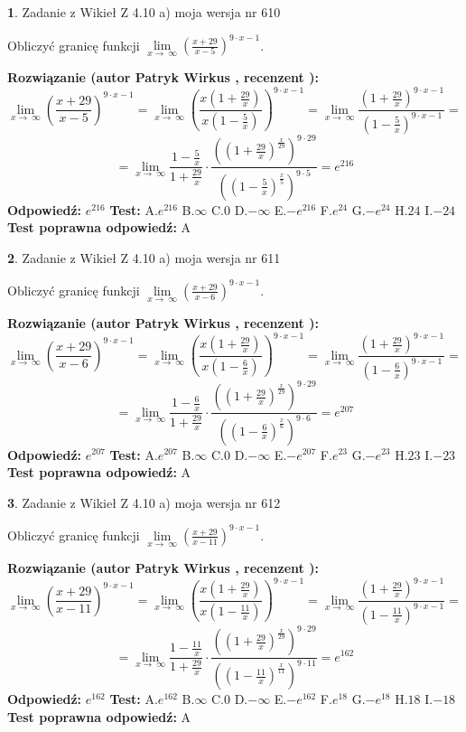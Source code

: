 \documentclass[12pt, a4paper]{article}
\theoremstyle{definition} %
\newtheorem{zad}{}
\newcommand{\zadStart}[1]{\begin{zad}#1\newline}
\newcommand{\zadStop}{\end{zad}}
\newcommand{\rozwStart}[2]{\noindent \textbf{Rozwiązanie (autor #1 , recenzent #2): }\newline}
\newcommand{\rozwStop}{\newline}
\newcommand{\odpStart}{\noindent \textbf{Odpowiedź:}\newline}
\newcommand{\odpStop}{\newline}
\newcommand{\testStart}{\noindent \textbf{Test:}\newline}
\newcommand{\testStop}{\newline}
\newcommand{\kluczStart}{\noindent \textbf{Test poprawna odpowiedź:}\newline}
\newcommand{\kluczStop}{\newline}
\begin{document}
\zadStart{Zadanie z Wikieł Z 4.10 a) moja wersja nr 610}

Obliczyć granicę funkcji  $\lim\limits_{x\to\ \infty}(\frac{x+29}{x-5})^{9\cdot x-1}$.
\zadStop
\rozwStart{Patryk Wirkus}{}
$$\lim\limits_{x\to\ \infty}(\frac{x+29}{x-5})^{9\cdot x-1} = \lim\limits_{x\to\ \infty}(\frac{x(1+\frac{29}{x})}{x(1-\frac{5}{x})})^{9\cdot x-1}=\lim\limits_{x\to\ \infty}\frac{(1+\frac{29}{x})^{9\cdot x-1}}{(1-\frac{5}{x})^{9\cdot x-1}}=$$
$$=\lim\limits_{x\to\ \infty}\frac{1-\frac{5}{x}}{1+\frac{29}{x}}\cdot\frac{((1+\frac{29}{x})^{\frac{x}{29}})^{9\cdot29}}{((1-\frac{5}{x})^{\frac{x}{5}})^{9\cdot5}}=e^{216}$$
\rozwStop
\odpStart
$e^{216}$
\odpStop
\testStart
A.$e^{216}$ B.$\infty$ C.$0$ D.$-\infty$ E.$-e^{216}$
F.$e^{24}$ G.$-e^{24}$
H.$24$
I.$-24$
\testStop
\kluczStart
A
\kluczStop



\zadStart{Zadanie z Wikieł Z 4.10 a) moja wersja nr 611}

Obliczyć granicę funkcji  $\lim\limits_{x\to\ \infty}(\frac{x+29}{x-6})^{9\cdot x-1}$.
\zadStop
\rozwStart{Patryk Wirkus}{}
$$\lim\limits_{x\to\ \infty}(\frac{x+29}{x-6})^{9\cdot x-1} = \lim\limits_{x\to\ \infty}(\frac{x(1+\frac{29}{x})}{x(1-\frac{6}{x})})^{9\cdot x-1}=\lim\limits_{x\to\ \infty}\frac{(1+\frac{29}{x})^{9\cdot x-1}}{(1-\frac{6}{x})^{9\cdot x-1}}=$$
$$=\lim\limits_{x\to\ \infty}\frac{1-\frac{6}{x}}{1+\frac{29}{x}}\cdot\frac{((1+\frac{29}{x})^{\frac{x}{29}})^{9\cdot29}}{((1-\frac{6}{x})^{\frac{x}{6}})^{9\cdot6}}=e^{207}$$
\rozwStop
\odpStart
$e^{207}$
\odpStop
\testStart
A.$e^{207}$ B.$\infty$ C.$0$ D.$-\infty$ E.$-e^{207}$
F.$e^{23}$ G.$-e^{23}$
H.$23$
I.$-23$
\testStop
\kluczStart
A
\kluczStop



\zadStart{Zadanie z Wikieł Z 4.10 a) moja wersja nr 612}

Obliczyć granicę funkcji  $\lim\limits_{x\to\ \infty}(\frac{x+29}{x-11})^{9\cdot x-1}$.
\zadStop
\rozwStart{Patryk Wirkus}{}
$$\lim\limits_{x\to\ \infty}(\frac{x+29}{x-11})^{9\cdot x-1} = \lim\limits_{x\to\ \infty}(\frac{x(1+\frac{29}{x})}{x(1-\frac{11}{x})})^{9\cdot x-1}=\lim\limits_{x\to\ \infty}\frac{(1+\frac{29}{x})^{9\cdot x-1}}{(1-\frac{11}{x})^{9\cdot x-1}}=$$
$$=\lim\limits_{x\to\ \infty}\frac{1-\frac{11}{x}}{1+\frac{29}{x}}\cdot\frac{((1+\frac{29}{x})^{\frac{x}{29}})^{9\cdot29}}{((1-\frac{11}{x})^{\frac{x}{11}})^{9\cdot11}}=e^{162}$$
\rozwStop
\odpStart
$e^{162}$
\odpStop
\testStart
A.$e^{162}$ B.$\infty$ C.$0$ D.$-\infty$ E.$-e^{162}$
F.$e^{18}$ G.$-e^{18}$
H.$18$
I.$-18$
\testStop
\kluczStart
A
\kluczStop
\end{document}
